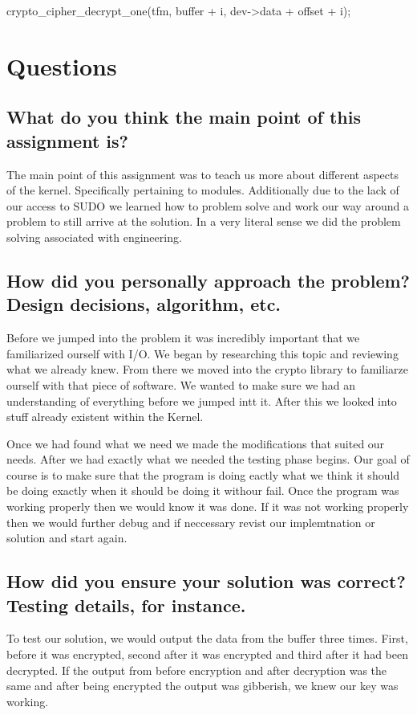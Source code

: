\documentclass[letterpaper,10pt,titlepage]{article}
\begin{document}
crypto\_cipher\_decrypt\_one(tfm, buffer + i, dev->data + offset + i);

\section{Questions}
\subsection{What do you think the main point of this assignment is?}

 \sloppy The main point of this assignment was to teach us more about different aspects of the kernel.
Specifically pertaining to modules. Additionally due to the lack of our access to SUDO we learned how to problem solve and work our way around a problem to still arrive at the solution. In a very literal sense we did the problem solving associated with engineering.

\subsection{How did you personally approach the problem? Design decisions, algorithm, etc.}

\sloppy Before we jumped into the problem it was incredibly important that we familiarized ourself with I/O. We began by researching this topic and reviewing what we already knew. From there we moved into the crypto library to familiarze ourself with that piece of software. We wanted to make sure we had an understanding of everything before we jumped intt it. After this we looked into stuff already existent within the Kernel.


\sloppy Once we had found what we need we made the modifications that suited our needs. After we had exactly what we needed the testing phase begins. Our goal of course is to make sure that the program is doing eactly what we think it should be doing exactly when it should be doing it withour fail. Once the program was working properly then we would know it was done. If it was not working properly then we would further debug and if neccessary revist our implemtnation or solution and start again.

\subsection{How did you ensure your solution was correct? Testing details, for instance.}

\sloppy To test our solution, we would output the data from the buffer three times. First, before it was encrypted, second after it was encrypted and third after it had been decrypted. If the output from before encryption and after decryption was the same and after being encrypted the output was gibberish, we knew our key was working. 
\end{document}
